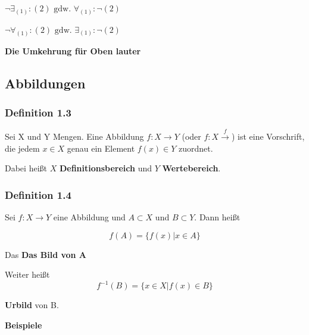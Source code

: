 \documentclass{scrartcl}
\begin{document}
$\lnot \exists_{(1)} : (2) \text{ gdw. } \forall_{(1)}:\lnot (2)$

$\lnot \forall_{(1)} : (2) \text{ gdw. } \exists_{(1)}:\lnot (2)$

\textbf{Die Umkehrung für Oben lauter}

\subsection{Abbildungen}

\subsubsection{Definition 1.3}

Sei X und Y Mengen. Eine Abbildung $f:X \to Y$ (oder $f:X \stackrel{f}{\to}$) ist eine  
Vorschrift, die jedem $x \in X$ genau ein Element $f(x) \in Y$ zuordnet.

Dabei heißt $X$ \textbf{Definitionsbereich} und $Y$ \textbf{Wertebereich}.

\subsubsection{Definition 1.4}

Sei $f:X \to Y$ eine Abbildung und $A \subset X$ und $B \subset Y$. Dann heißt

\[f(A)=\{f(x)|x \in A\}\]

Das \textbf{Das Bild von A}

Weiter heißt \[f^{-1}(B)=\{x\in X|f(x) \in B\}\]

\textbf{Urbild} von B.

\textbf{Beispiele}
\end{document}
